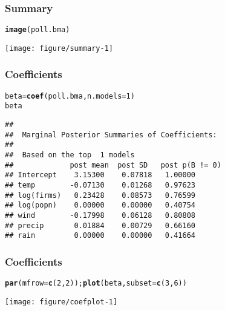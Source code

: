 \documentclass[handout]{beamer}\usepackage[]{graphicx}\usepackage[]{color}
\makeatletter
\def\maxwidth{ %
  \ifdim\Gin@nat@width>\linewidth
    \linewidth
  \else
    \Gin@nat@width
  \fi
}
\newcommand{\hlnum}[1]{\textcolor[rgb]{0.686,0.059,0.569}{#1}}%
\newcommand{\hlstd}[1]{\textcolor[rgb]{0.345,0.345,0.345}{#1}}%
\newcommand{\hlkwb}[1]{\textcolor[rgb]{0.69,0.353,0.396}{#1}}%
\newcommand{\hlkwc}[1]{\textcolor[rgb]{0.333,0.667,0.333}{#1}}%
\newcommand{\hlkwd}[1]{\textcolor[rgb]{0.737,0.353,0.396}{\textbf{#1}}}%
\newenvironment{kframe}{%
 \def\at@end@of@kframe{}%
 \ifinner\ifhmode%
  \def\at@end@of@kframe{\end{minipage}}%
  \begin{minipage}{\columnwidth}%
 \fi\fi%
 \def\FrameCommand##1{\hskip\@totalleftmargin \hskip-\fboxsep
 \colorbox{shadecolor}{##1}\hskip-\fboxsep
     \hskip-\linewidth \hskip-\@totalleftmargin \hskip\columnwidth}%
 \MakeFramed {\advance\hsize-\width
   \@totalleftmargin\z@ \linewidth\hsize
   \@setminipage}}%
 {\par\unskip\endMakeFramed%
 \at@end@of@kframe}
\newenvironment{knitrout}{}{} %
\makeatother
\begin{document}
\begin{frame}\frametitle{Summary}
\begin{knitrout}
\color{fgcolor}\begin{kframe}
\begin{alltt}
\hlkwd{image}\hlstd{(poll.bma)}
\end{alltt}
\end{kframe}

{\centering \texttt{[image: figure/summary-1]} 

}



\end{knitrout}
\end{frame}

\begin{frame}[fragile] \frametitle{Coefficients}
\begin{knitrout}
\color{fgcolor}\begin{kframe}
\begin{alltt}
 \hlstd{beta} \hlkwb{=} \hlkwd{coef}\hlstd{(poll.bma,} \hlkwc{n.models}\hlstd{=}\hlnum{1}\hlstd{)}
 \hlstd{beta}
\end{alltt}
\begin{verbatim}
## 
##  Marginal Posterior Summaries of Coefficients: 
## 
##  Based on the top  1 models 
##             post mean  post SD   post p(B != 0)
## Intercept    3.15300    0.07818   1.00000      
## temp        -0.07130    0.01268   0.97623      
## log(firms)   0.23428    0.08573   0.76599      
## log(popn)    0.00000    0.00000   0.40754      
## wind        -0.17998    0.06128   0.80808      
## precip       0.01884    0.00729   0.66160      
## rain         0.00000    0.00000   0.41664
\end{verbatim}
\end{kframe}
\end{knitrout}
\end{frame}

\begin{frame}[fragile] \frametitle{Coefficients}
\begin{knitrout}
\color{fgcolor}\begin{kframe}
\begin{alltt}
 \hlkwd{par}\hlstd{(}\hlkwc{mfrow}\hlstd{=}\hlkwd{c}\hlstd{(}\hlnum{2}\hlstd{,}\hlnum{2}\hlstd{));}  \hlkwd{plot}\hlstd{(beta,} \hlkwc{subset}\hlstd{=}\hlkwd{c}\hlstd{(}\hlnum{3}\hlstd{,} \hlnum{6}\hlstd{))}
\end{alltt}
\end{kframe}
\texttt{[image: figure/coefplot-1]} 

\end{knitrout}

\end{frame}
\end{document}
